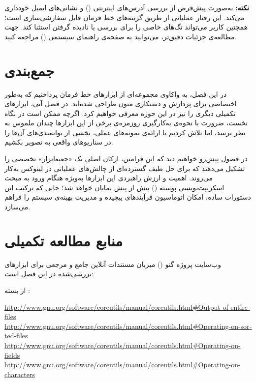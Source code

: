 \begin{note}
\textbf{نکته:}  به‌صورت پیش‌فرض از بررسی آدرس‌های اینترنتی () و نشانی‌های ایمیل خودداری می‌کند. این رفتار عملیاتی از طریق گزینه‌های خط فرمان قابل سفارشی‌سازی است؛ همچنین کاربر می‌تواند تگ‌های خاصی را برای بررسی یا نادیده گرفتن استثنا کند. جهت مطالعه‌ی جزئیات دقیق‌تر، می‌توانید به صفحه‌ی راهنمای سیستمی () مراجعه کنید.
\end{note}

\section{جمع‌بندی}

در این فصل، به واکاوی مجموعه‌ای از ابزارهای خط فرمان پرداختیم که به‌طور اختصاصی برای پردازش و دستکاری متون طراحی شده‌اند. در فصل آتی، ابزارهای تکمیلی دیگری را نیز در این حوزه معرفی خواهیم کرد. اگرچه ممکن است در نگاه نخست، ضرورت یا نحوه‌ی به‌کارگیری روزمره‌ی برخی از این ابزارها چندان ملموس به نظر نرسد، اما تلاش کردیم با ارائه‌ی نمونه‌های عملی، بخشی از توانمندی‌های آن‌ها را در سناریوهای واقعی به تصویر بکشیم.

در فصول پیش‌رو خواهیم دید که این فرامین، ارکان اصلی یک «جعبه‌ابزار» تخصصی را تشکیل می‌دهند که برای حل طیف گسترده‌ای از چالش‌های عملیاتی در لینوکس به‌کار می‌روند. اهمیت و ارزش راهبردی این ابزارها به‌ویژه هنگام ورود به مبحث اسکریپت‌نویسی پوسته () بیش از پیش نمایان خواهد شد؛ جایی که ترکیب این دستورات ساده، امکان اتوماسیون فرآیندهای پیچیده و مدیریت بهینه‌ی سیستم را فراهم می‌سازد.

\section{منابع مطالعه تکمیلی}

وب‌سایت پروژه گنو () میزبان مستندات آنلاین جامع و مرجعی برای ابزارهای بررسی‌شده در این فصل است:

از بسته :

\begin{latin}
\url{http://www.gnu.org/software/coreutils/manual/coreutils.html#Output-of-entire-files}\\
\url{http://www.gnu.org/software/coreutils/manual/coreutils.html#Operating-on-sorted-files}\\
\url{http://www.gnu.org/software/coreutils/manual/coreutils.html#Operating-on-fields}\\
\url{http://www.gnu.org/software/coreutils/manual/coreutils.html#Operating-on-characters}
\end{latin}

